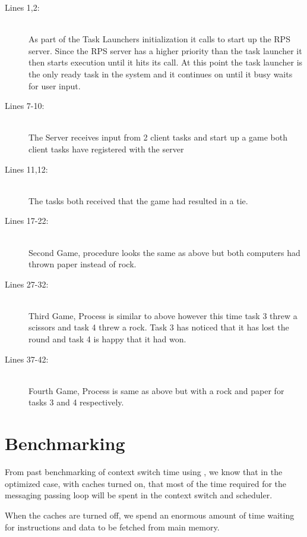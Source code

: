 \documentclass[pdftex,10pt,a4paper]{article}
\begin{document}
\begin{description}
\item[Lines 1,2:] \hfill \\
As part of the Task Launchers initialization it calls  to
start up the RPS server. Since the RPS server has a higher priority
than the task launcher it then starts execution until it hits its
 call. At this point the task launcher is the only
ready task in the system and it continues on until it busy waits for
user input.

\item[Lines 7-10:] \hfill \\
The Server receives input from 2 client tasks and start up a game
both client tasks have registered with the server

\item[Lines 11,12:] \hfill \\
The tasks both received that the game had resulted in a tie.

\item[Lines 17-22:] \hfill \\
Second Game, procedure looks the same as above but both computers had thrown paper
instead of rock.

\newpage
\item[Lines 27-32:] \hfill \\
Third Game, Process is similar to above however this time task 3 threw a scissors
and task 4 threw a rock. Task 3 has noticed that it has lost the round and task 4
is happy that it had won.

\item[Lines 37-42:] \hfill \\
Fourth Game, Process is same as above but with a rock and paper for tasks 3 and 4
respectively.
\end{description}


\section*{Benchmarking}

\begin{center}
\end{center}

From past benchmarking of context switch time using , we know that
in the optimized case, with caches turned on, that most of the time required
for the messaging passing loop will be spent in the context switch and scheduler.

When the caches are turned off, we spend an enormous amount of time
waiting for instructions and data to be fetched from main memory.
\end{document}
